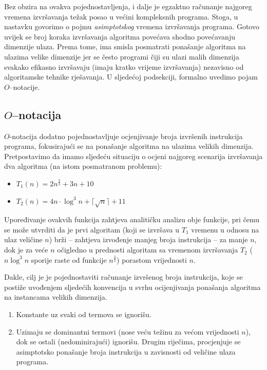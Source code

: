 Bez obzira na ovakva pojednostavljenja, i dalje je egzaktno računanje najgoreg vremena izvršavanja težak posao u većini kompleksnih programa. Stoga, u nastavku govorimo o pojmu \textit{asimptotskog} vremena izvršavanja programa.  Gotovo uvijek se broj koraka izvršavanja algoritma povećava shodno povećavanju dimenzije ulaza. Prema tome, ima smisla posmatrati ponašanje algoritma na  
ulazima velike dimenzije jer se često programi čiji su ulazi  malih dimenzija svakako efikasno izvršavaju (imaju kratko vrijeme izvršavanja)  nezavisno od algoritamske tehnike rješavanja. U sljedećoj podsekciji, formalno uvedimo pojam $O$--notacije. 
 
 
\subsection{$O$--notacija}  
$O$-notacija   dodatno pojednostavljuje ocjenjivanje broja izvršenih instrukcija  programa, fokusirajući se na ponašanje algoritma na ulazima velikih dimenzija.  Pretpostavimo da imamo sljedeću situaciju o ocjeni najgoreg scenarija izvrša\-vanja dva algoritma (na istom posmatranom problemu): 
\begin{itemize}
	\item $T_1(n) = 2 n^{\frac{3}{2}} + 3n + 10$
	\item $T_2(n) = 4 n \cdot \log^3 n + \lceil \sqrt{n} \rceil + 11 $
\end{itemize}

Upoređivanje ovakvih funkcija zahtjeva analitičku analizu obje funkcije, pri čemu se može utvrditi da je prvi algoritam (koji se izvršava u $T_1$ vremenu u odnosu na ulaz veličine $n$)  brži -- zahtjeva izvođenje manjeg broja instrukcija -- za manje $n$, dok je za veće $n$ očigledno u prednosti algoritam sa vremenom izvršavanja $T_2$ ($n \log^3 n$ sporije raste od funkcije $n^{\frac{3}{2}}$) porastom vrijednosti $n$. 

Dakle, cilj je je pojednostaviti računanje izvršenog broja instrukcija, koje se postiže uvođenjem sljedećih konvencija u svrhu ocijenjivanja ponaša\-nja algoritma na instancama velikih dimenzija.
\begin{enumerate}
	\item Konstante uz svaki od termova se ignorišu.
	\item Uzimaju se dominantni termovi (nose veću težinu za većom vrijednosti $n$), dok se ostali (nedominirajući) ignorišu. %
	Drugim riječima, procjenjuje se asimptotsko ponašanje broja instrukcija u zavisnosti od veličine ulaza programa. 
\end{enumerate}

